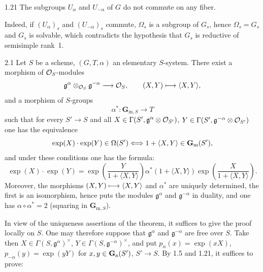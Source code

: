 \begin{corollary}{1.21}\label{XX.1.21}
The subgroups $U_\alpha$ and $U_{-\alpha}$ of $G$ do not commute on any fiber.
\end{corollary}
Indeed, if $(U_\alpha)_s$ and $(U_{-\alpha})_s$ commute, $\Omega_s$ is a subgroup of $G_s$, hence $\Omega_s=G_s${\renewcommand{\thefootnote}{(9)}} and $G_s$ is solvable, which contradicts the hypothesis that $G_s$ is reductive of semisimple rank~1.

\label{XX.sec.2}
\begin{theorem}{2.1}\label{XX.2.1}
Let $S$ be a scheme, $(G,T,\alpha)$ an elementary $S$-system. There exist a morphism of $\mathcal{O}_S$-modules
\[
\mathfrak g^\alpha\otimes_{\mathcal{O}_S}\mathfrak g^{-\alpha}\longrightarrow\mathcal{O}_S,\qquad(X,Y)\longmapsto\langle X,Y\rangle,
\]
and a morphism of $S$-groups
\[
\alpha^*:\mathbf G_{\mathrm m,S}\to T
\]
such that for every $S'\to S$ and all $X\in\Gamma(S',\mathfrak g^\alpha\otimes\mathcal{O}_{S'})$, $Y\in\Gamma(S',\mathfrak g^{-\alpha}\otimes\mathcal{O}_{S'})$ one has the equivalence
\[
\exp(X)\cdot\exp(Y)\in\Omega(S')\Longleftrightarrow 1+\langle X,Y\rangle\in\mathbf{G}_{\mathrm{m}}(S'),
\]
and under these conditions one has the formula:
\begin{equation}\tag{F}\label{XX.eq.F}
\boxed{\exp(X)\cdot\exp(Y)=\exp\left(\frac{Y}{1+\langle X,Y\rangle}\right)\alpha^*(1+\langle X,Y\rangle)\exp\left(\frac{X}{1+\langle X,Y\rangle}\right).}
\end{equation}
Moreover, the morphisms $(X,Y)\longmapsto\langle X,Y\rangle$ and $\alpha^*$ are uniquely determined, the first is an isomorphism, hence puts the modules $\mathfrak g^\alpha$ and $\mathfrak g^{-\alpha}$ in duality, and one has $\alpha\circ\alpha^*=2$ (squaring in $\mathbf G_{\mathrm m,S}$).
\end{theorem}
In view of the uniqueness assertions of the theorem, it suffices to give the proof locally on $S$. One may therefore suppose that $\mathfrak g^\alpha$ and $\mathfrak g^{-\alpha}$ are free over $S$. Take then $X\in\Gamma(S,\mathfrak g^\alpha)^\times$, $Y\in\Gamma(S,\mathfrak g^{-\alpha})^\times$, and put $p_\alpha(x)=\exp(xX)$, $p_{-\alpha}(y)=\exp(yY)$ for $x,y\in\mathbf{G}_{\mathrm{a}}(S')$, $S'\to S$. By 1.5 and 1.21, it suffices to prove:


